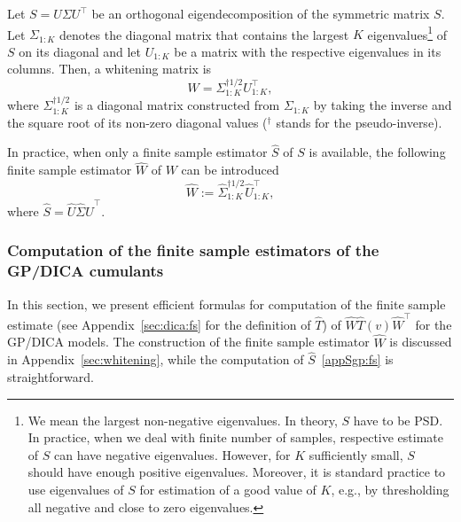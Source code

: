 \documentclass{article}
\newcommand{\wh}[1]{\widehat{#1}}
\begin{document}
Let $S = U \Sigma U^{\top}$ be an orthogonal eigendecomposition of the symmetric matrix $S$. Let $\Sigma_{1:K}$ denotes the diagonal matrix that contains the largest $K$ eigenvalues\footnote{We mean the largest non-negative eigenvalues. In theory, $S$ have to be PSD. In practice, when we deal with finite number of samples, respective estimate of $S$ can have negative eigenvalues. However, for $K$ sufficiently small, $S$ should have enough positive eigenvalues. Moreover, it is standard practice to use eigenvalues of $S$ for estimation of a good value of $K$, e.g., by thresholding all negative and close to zero eigenvalues.}  
of $S$ on its diagonal and let $U_{1:K}$ be a matrix with the respective eigenvalues in its columns. Then, a whitening matrix is
\begin{equation}\label{W}
W = \Sigma_{1:K}^{\dagger 1/2}U_{1:K}^{\top} ,
\end{equation}
where $\Sigma_{1:K}^{\dagger 1/2}$ is a diagonal matrix constructed from $\Sigma_{1:K}$ by taking the inverse and the square root of its non-zero diagonal values ($^{\dagger}$ stands for the pseudo-inverse).

In practice, when only a finite sample estimator $\wh{S}$ of $S$ is available, the following finite sample estimator $\wh{W}$ of $W$ can be introduced
\begin{equation}\label{W-fs}
\wh{W} :=  \wh{\Sigma}_{1:K}^{\dagger 1/2} \wh{U}_{1:K}^{\top},
\end{equation}
where $\wh{S} = \wh{U} \wh{\Sigma} \wh{U}^{\top}$.













\subsubsection{Computation of the finite sample estimators of the GP/DICA cumulants} \label{sec:dica:empirical}
In this section, we present efficient formulas for computation of the finite sample estimate (see Appendix~\ref{sec:dica:fs} for the definition of $\wh{T}$) of  $\wh{W}\wh{T}(v)\wh{W}^{\top}$ for the GP/DICA models. The construction of the finite sample estimator $\wh{W}$ is discussed in Appendix~\ref{sec:whitening}, while the computation of $\wh{S}$~\eqref{appSgp:fs} is straightforward.
\end{document}
